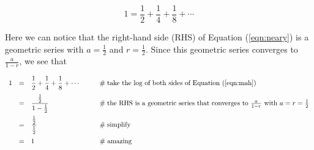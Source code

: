 \documentclass[11pt, oneside]{article}
\theoremstyle{definition}
\begin{document}
\bigskip
\begin{equation}
1 = \dfrac{1}{2} + \dfrac{1}{4} + \dfrac{1}{8} + \cdots
\label{eqn:neary}
\end{equation}

\bigskip
\noindent
Here we can notice that the right-hand side (RHS) 
of Equation (\ref{eqn:neary}) is a geometric series 
\cite{wiki:geometric_series} with $a = \frac{1}{2}$ 
and $r = \frac{1}{2}$. Since this geometric series 
converges to $\frac{a}{1-r}$, we see that

\begin{equation*}
\begin{array}{llll}
1 
&=& \dfrac{1}{2} + \dfrac{1}{4} + \dfrac{1}{8} + \cdots
		&\qquad \mathrel{\#} \text{take the log of both sides of Equation (\ref{eqn:mah})} \\
[10pt]
&=& \dfrac{\frac{1}{2}}{1-\frac{1}{2}}
		&\qquad \mathrel{\#} \text{the RHS is a geometric series that 
		                           converges to $\frac{a}{1-r}$ with $a=r=\frac{1}{2}$} \\
[12pt]
&=& \dfrac{\frac{1}{2}}{\frac{1}{2}}
		&\qquad \mathrel{\#} \text{simplify} \\
[12pt]
&=& 1
		&\qquad \mathrel{\#} \text{amazing} \\
\end{array}
\end{equation*}



%
%
%
%
%


%
%
\end{document}
